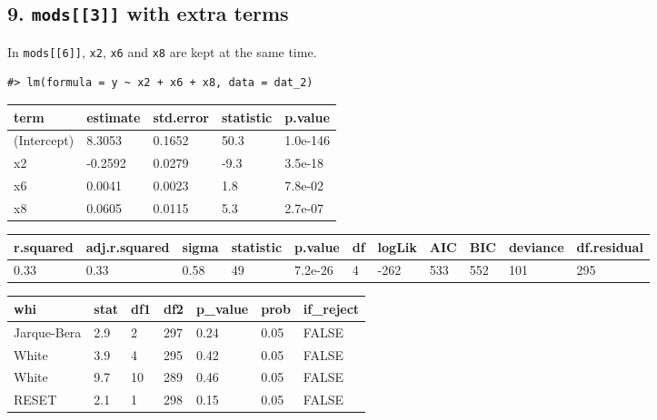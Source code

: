 \documentclass[a4paper]{article}
\begin{document}
\hypertarget{mods3-with-extra-terms}{%
\subsection{\texorpdfstring{9. \texttt{mods{[}{[}3{]}{]}} with extra
terms}{9. mods{[}{[}3{]}{]} with extra terms}}\label{mods3-with-extra-terms}}

In \texttt{mods{[}{[}6{]}{]}}, \texttt{x2}, \texttt{x6} and \texttt{x8}
are kept at the same time.

\begin{verbatim}
#> lm(formula = y ~ x2 + x6 + x8, data = dat_2)
\end{verbatim}

\begin{table}[H]
\centering
\begin{tabular}{lllll}
\toprule
term & estimate & std.error & statistic & p.value\\
\midrule
(Intercept) & 8.3053 & 0.1652 & 50.3 & 1.0e-146\\
x2 & -0.2592 & 0.0279 & -9.3 & 3.5e-18\\
x6 & 0.0041 & 0.0023 & 1.8 & 7.8e-02\\
x8 & 0.0605 & 0.0115 & 5.3 & 2.7e-07\\
\bottomrule
\end{tabular}
\end{table}

\begin{table}[H]
\centering
\begin{tabular}{lllllllllll}
\toprule
r.squared & adj.r.squared & sigma & statistic & p.value & df & logLik & AIC & BIC & deviance & df.residual\\
\midrule
0.33 & 0.33 & 0.58 & 49 & 7.2e-26 & 4 & -262 & 533 & 552 & 101 & 295\\
\bottomrule
\end{tabular}
\end{table}

\begin{table}[H]
\centering
\begin{tabular}{lllllll}
\toprule
whi & stat & df1 & df2 & p\_value & prob & if\_reject\\
\midrule
Jarque-Bera & 2.9 & 2 & 297 & 0.24 & 0.05 & FALSE\\
White & 3.9 & 4 & 295 & 0.42 & 0.05 & FALSE\\
White & 9.7 & 10 & 289 & 0.46 & 0.05 & FALSE\\
RESET & 2.1 & 1 & 298 & 0.15 & 0.05 & FALSE\\
\bottomrule
\end{tabular}
\end{table}
\end{document}
